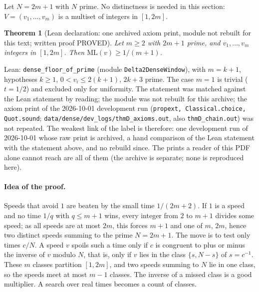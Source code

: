\documentclass[11pt]{article}
\newtheorem{theorem}{Theorem}
\theoremstyle{remark}
\newcommand{\ML}{\mathrm{ML}}
\begin{document}
Let $N=2m+1$ with $N$ prime. No distinctness is needed in this section: $V=(v_1,\dots,v_m)$ is a multiset of integers in $[1,2m]$.

\setcounter{theorem}{2}%
\begin{theorem}[Lean declaration: one archived axiom print, module not rebuilt for this text; written proof PROVED]\label{thm:D}
Let $m\ge2$ with $2m+1$ prime, and $v_1,\dots,v_m$ integers in $[1,2m]$. Then $\ML(v)\ge1/(m+1)$.
\end{theorem}
\noindent Lean: \texttt{dense\_floor\_of\_prime} (module \texttt{Delta2DenseWindow}), with $m=k+1$, hypotheses $k\ge1$, $0<v_i\le 2(k+1)$, $2k+3$ prime. The case $m=1$ is trivial ($t=1/2$) and excluded only for uniformity. The statement was matched against the Lean statement by reading; the module was not rebuilt for this archive; the axiom print of the 2026-10-01 development run (\texttt{propext, Classical.choice, Quot.sound}; \texttt{data/dense/dev\_logs/thmD\_axioms.out}, also \texttt{thmD\_chain.out}) was not repeated. The weakest link of the label is therefore: one development run of 2026-10-01 whose raw print is archived, a hand comparison of the Lean statement with the statement above, and no rebuild since. The prints a reader of this PDF alone cannot reach are all of them (the archive is separate; none is reproduced here).

\paragraph{Idea of the proof.} Speeds that avoid $1$ are beaten by the small time $1/(2m+2)$. If $1$ is a speed and no time $1/q$ with $q\le m+1$ wins, every integer from $2$ to $m+1$ divides some speed; as all speeds are at most $2m$, this forces $m+1$ and one of $m$, $2m$, hence two distinct speeds summing to the prime $N=2m+1$. The move is to test only times $c/N$. A speed $v$ spoils such a time only if $c$ is congruent to plus or minus the inverse of $v$ modulo $N$, that is, only if $v$ lies in the class $\{s,N-s\}$ of $s=c^{-1}$. These $m$ classes partition $[1,2m]$, and two speeds summing to $N$ lie in one class, so the speeds meet at most $m-1$ classes. The inverse of a missed class is a good multiplier. A search over real times becomes a count of classes.
\end{document}
